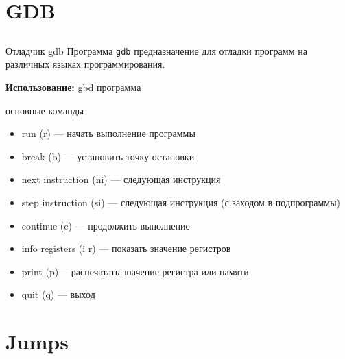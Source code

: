 \documentclass[utf8, russian]{beamer}
\begin{document}
    \section{GDB}
    \subsection{}
    \begin{frame}{Отладчик gdb}
    Программа {\tt gdb} предназначение для отладки программ на различных языках программирования.

    {\bf Использование:} gbd программа
    \begin{block}{основные команды}
        \begin{itemize}
            \item run (r) --- начать выполнение программы
            \item break (b) --- установить точку остановки
            \item next instruction (ni) --- следующая инструкция
            \item step instruction (si) --- следующая инструкция (с заходом в подпрограммы)
            \item continue (c) --- продолжить выполнение
            \item info registers (i r) --- показать значение регистров
            \item print (p)--- распечатать значение регистра или памяти
            \item quit (q) --- выход
        \end{itemize}
    \end{block}
    \end{frame}
    \section{Jumps}
\end{document}

